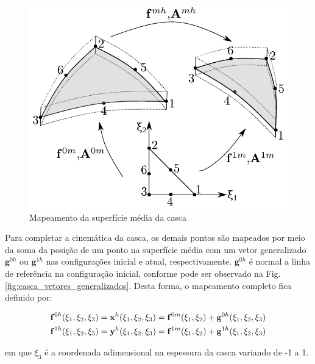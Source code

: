 \documentclass[tese_patricia]{subfiles}
\begin{document}
\begin{figure}[htb!]
	\centering
	\includegraphics[scale=0.8,trim=0cm 0.0cm 0cm 0cm, clip=true]{Imagens/Cap4/casca_super_media.pdf}	
	\caption{Mapeamento da superfície média da casca}
	\label{fig:casca:map_super_media}
\end{figure}

Para completar a cinemática da casca, os demais pontos são mapeados por meio da soma da posição de um ponto na superfície média com um vetor generalizado $\mathbf{g}^{0h}$ ou $\mathbf{g}^{1h}$ nas configurações inicial e atual, respectivamente.  $\mathbf{g}^{0h}$ é normal a linha de referência na configuração inicial, conforme pode ser observado na Fig. \ref{fig:casca_vetores_generalizados}. Desta forma, o mapeamento completo fica definido por:

\begin{align}
\mathbf{f}^{0h}(\xi_{1},\xi_{2},\xi_{3}) = \mathbf{x}^{h}(\xi_{1},\xi_{2},\xi_{3}) = \mathbf{f}^{0m}(\xi_{1},\xi_{2}) + \mathbf{g}^{0h} (\xi_{1},\xi_{2}, \xi_{3}) \label{eq:fmap0}\\
\mathbf{f}^{1h}(\xi_{1},\xi_{2},\xi_{3}) = \mathbf{y}^{h}(\xi_{1},\xi_{2},\xi_{3}) = \mathbf{f}^{1m}(\xi_{1},\xi_{2}) + \mathbf{g}^{1h} (\xi_{1},\xi_{2}, \xi_{3})  \label{eq:fmap1}
\end{align}

\noindent em que $\xi_3$ é a coordenada adimensional na espessura da casca variando de -1 a 1.
\end{document}
